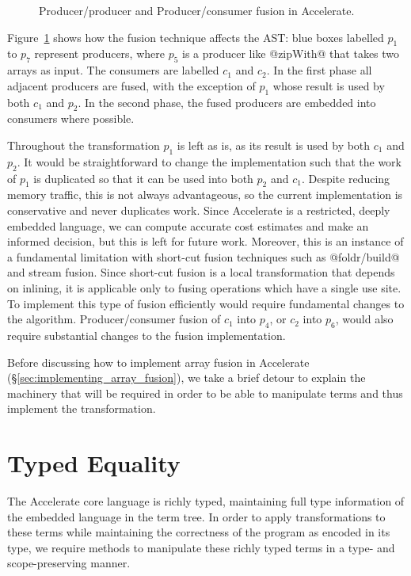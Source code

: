 \begin{figure}[htb]
    \caption[Fusion in Accelerate]{Producer/producer and Producer/consumer fusion in Accelerate.}
    \label{fig:fusion}
\end{figure}

Figure~\ref{fig:fusion} shows how the fusion technique affects the
AST: blue boxes labelled $p_1$ to $p_7$ represent
producers, where $p_5$ is a producer like @zipWith@ that takes two arrays
as input. The consumers are labelled $c_1$ and $c_2$. In the first phase all
adjacent producers are fused, with the exception of $p_1$ whose result is used
by both $c_1$ and $p_2$. In the second phase, the fused producers are embedded
into consumers where possible.

Throughout the transformation $p_1$ is left as is, as its result is used by both
$c_1$ and $p_2$. It would be straightforward to change the implementation such
that the work of $p_1$ is duplicated so that it can be used into both $p_2$ and
$c_1$. Despite reducing memory traffic, this is not always advantageous, so the
current implementation is conservative and never duplicates work. Since
Accelerate is a restricted, deeply embedded language, we can compute accurate
cost estimates and make an informed decision, but this is left for future work.
Moreover, this is an instance of a fundamental limitation with
short-cut fusion techniques such as
@foldr/build@ and stream
fusion. Since short-cut fusion is a local transformation that depends on
inlining, it is applicable only to fusing operations which have a single use
site. To implement this type of fusion efficiently would require fundamental
changes to the algorithm.
%
Producer/consumer fusion of $c_1$ into $p_4$, or $c_2$ into $p_6$, would also
require substantial changes to the fusion implementation.

Before discussing how to implement array fusion in Accelerate
(\S\ref{sec:implementing_array_fusion}), we take a brief detour to explain the
machinery that will be required in order to be able to manipulate terms and thus
implement the transformation.


\section{Typed Equality}
\label{sec:equality}

The Accelerate core language is richly typed, maintaining full type information
of the embedded language in the term tree. In order to apply transformations to
these terms while maintaining the correctness of the program as encoded in its
type, we require methods to manipulate these richly typed terms in a type- and
scope-preserving manner.

